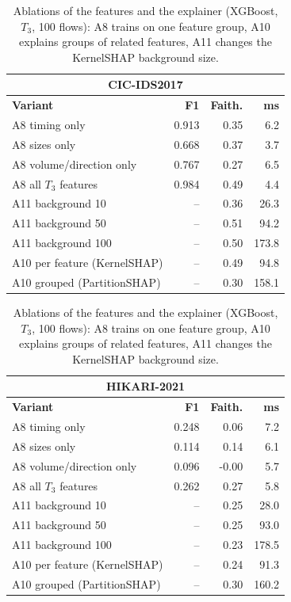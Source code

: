 \begin{table}[!htbp]
\centering
\caption{Ablations of the features and the explainer (XGBoost, $T_3$, 100 flows): A8 trains on one feature group, A10 explains groups of related features, A11 changes the KernelSHAP background size.}
\label{tab:extra}
\scriptsize
\setlength{\tabcolsep}{4pt}
\begin{minipage}[t]{0.495\textwidth}
\centering
\begin{tabular}{lrrr}
\toprule
\multicolumn{4}{c}{\textbf{CIC-IDS2017}} \\
\midrule
\textbf{Variant} & \textbf{F1} & \textbf{Faith.} & \textbf{ms} \\
\midrule
A8 timing only & 0.913 & 0.35 & 6.2 \\
A8 sizes only & 0.668 & 0.37 & 3.7 \\
A8 volume/direction only & 0.767 & 0.27 & 6.5 \\
A8 all $T_3$ features & 0.984 & 0.49 & 4.4 \\
A11 background 10 & -- & 0.36 & 26.3 \\
A11 background 50 & -- & 0.51 & 94.2 \\
A11 background 100 & -- & 0.50 & 173.8 \\
A10 per feature (KernelSHAP) & -- & 0.49 & 94.8 \\
A10 grouped (PartitionSHAP) & -- & 0.30 & 158.1 \\
\bottomrule
\end{tabular}
\end{minipage}
\hfill
\begin{minipage}[t]{0.495\textwidth}
\centering
\begin{tabular}{lrrr}
\toprule
\multicolumn{4}{c}{\textbf{HIKARI-2021}} \\
\midrule
\textbf{Variant} & \textbf{F1} & \textbf{Faith.} & \textbf{ms} \\
\midrule
A8 timing only & 0.248 & 0.06 & 7.2 \\
A8 sizes only & 0.114 & 0.14 & 6.1 \\
A8 volume/direction only & 0.096 & -0.00 & 5.7 \\
A8 all $T_3$ features & 0.262 & 0.27 & 5.8 \\
A11 background 10 & -- & 0.25 & 28.0 \\
A11 background 50 & -- & 0.25 & 93.0 \\
A11 background 100 & -- & 0.23 & 178.5 \\
A10 per feature (KernelSHAP) & -- & 0.24 & 91.3 \\
A10 grouped (PartitionSHAP) & -- & 0.30 & 160.2 \\
\bottomrule
\end{tabular}
\end{minipage}
\end{table}
